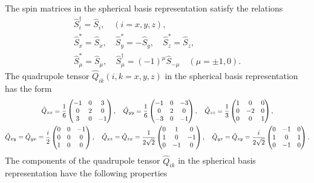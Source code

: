 The spin matrices in the spherical basis representation satisfy the relations
\begin{gather}
\widehat{S}_{i}^{\dagger}=\widehat{S}_{i}, \quad(i=x, y, z) , \label{eq:2:6:12}\\
\widehat{S}_{x}^{*}=\widehat{S}_{x}, \quad \widehat{S}_{y}^{*}=-\widehat{S}_{y}, \quad \widehat{S}_{z}^{*}=\widehat{S}_{z}  ,\label{eq:2:6:13}\\
\widehat{S}_{\mu}^{*}=\widehat{S}_{\mu}, \quad \widehat{S}_{\mu}^{\dagger}=(-1)^{\mu} \widehat{S}_{-\mu} \quad(\mu= \pm 1,0). \label{eq:2:6:14}
\end{gather}
The quadrupole tensor $\widehat{Q}_{i k}(i, k=x, y, z)$ in the spherical basis representation has the form
\begin{gather}
\hat{Q}_{x x}=\frac{1}{6}\begin{pmatrix}
-1 & 0 & 3 \\
0 & 2 & 0 \\
3 & 0 & -1
\end{pmatrix}, \quad \hat{Q}_{y y}=\frac{1}{6}\begin{pmatrix}
-1 & 0 & -3 \\
0 & 2 & 0 \\
-3 & 0 & -1
\end{pmatrix}, \quad \hat{Q}_{z z}=\frac{1}{3}\begin{pmatrix}
1 & 0 & 0 \\
0 & -2 & 0 \\
0 & 0 & 1
\end{pmatrix},  \label{eq:2:6:15}\\
\hat{Q}_{x y}=\hat{Q}_{y x}=\frac{i}{2}\begin{pmatrix}
0 & 0 & -1 \\
0 & 0 & 0 \\
1 & 0 & 0
\end{pmatrix}, \quad \hat{Q}_{x z}=\hat{Q}_{z x}=\frac{1}{2 \sqrt{2}}\begin{pmatrix}
0 & 1 & 0 \\
1 & 0 & -1 \\
0 & -1 & 0
\end{pmatrix}, \quad \hat{Q}_{y z}=\hat{Q}_{z y}=\frac{i}{2 \sqrt{2}}\begin{pmatrix}
0 & -1 & 0 \\
1 & 0 & 1 \\
0 & -1 & 0
\end{pmatrix} . \notag
\end{gather}
The components of the quadrupole tensor $\widehat{Q}_{i k}$ in the spherical basis representation have the following properties
